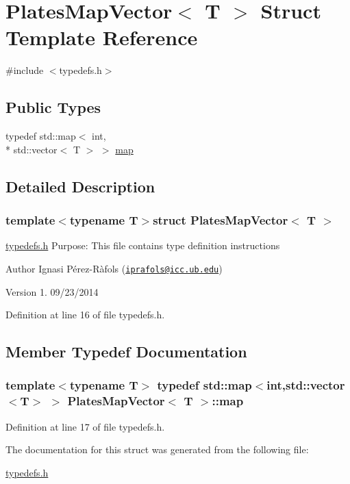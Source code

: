 \hypertarget{struct_plates_map_vector}{\section{Plates\-Map\-Vector$<$ T $>$ Struct Template Reference}
\label{struct_plates_map_vector}
}


{\ttfamily \#include $<$typedefs.\-h$>$}

\subsection*{Public Types}
\begin{DoxyCompactItemize}
\item 
typedef std\-::map$<$ int, \\*
std\-::vector$<$ T $>$ $>$ \hyperlink{struct_plates_map_vector_af6ed57811a3a97a0bd3621c5a704d7db}{map}
\end{DoxyCompactItemize}


\subsection{Detailed Description}
\subsubsection*{template$<$typename T$>$struct Plates\-Map\-Vector$<$ T $>$}

\hyperlink{typedefs_8h}{typedefs.\-h} Purpose\-: This file contains type definition instructions

\begin{DoxyAuthor}{Author}
Ignasi Pérez-\/\-Ràfols (\href{mailto:iprafols@icc.ub.edu}{\tt iprafols@icc.\-ub.\-edu}) 
\end{DoxyAuthor}
\begin{DoxyVersion}{Version}
1. 09/23/2014 
\end{DoxyVersion}


Definition at line 16 of file typedefs.\-h.



\subsection{Member Typedef Documentation}
\hypertarget{struct_plates_map_vector_af6ed57811a3a97a0bd3621c5a704d7db}{
\subsubsection[{map}]{\setlength{\rightskip}{0pt plus 5cm}template$<$typename T$>$ typedef std\-::map$<$int,std\-::vector$<$T$>$ $>$ {\bf Plates\-Map\-Vector}$<$ T $>$\-::{\bf map}}}\label{struct_plates_map_vector_af6ed57811a3a97a0bd3621c5a704d7db}


Definition at line 17 of file typedefs.\-h.



The documentation for this struct was generated from the following file\-:\begin{DoxyCompactItemize}
\item 
\hyperlink{typedefs_8h}{typedefs.\-h}\end{DoxyCompactItemize}
